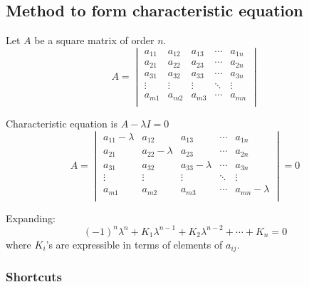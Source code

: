 \documentclass[english,course,fleqn]{lecture}
\begin{document}
\subsection{Method to form characteristic equation}


Let $A$ be a square matrix of order $n$.
\[
  A = \begin{vmatrix}
    a_{11} & a_{12} & a_{13} & \cdots & a_{1n} \\
    a_{21} & a_{22} & a_{23} & \cdots & a_{2n} \\
    a_{31} & a_{32} & a_{33} & \cdots & a_{3n} \\
    \vdots & \vdots & \vdots & \ddots & \vdots \\
    a_{m1} & a_{m2} & a_{m3} & \cdots & a_{mn} \\
  \end{vmatrix}
\]

Characteristic equation is $A - \lambda I = 0$
\[
  A = \begin{vmatrix}
    a_{11} - \lambda & a_{12} & a_{13} & \cdots & a_{1n} \\
    a_{21} & a_{22} - \lambda & a_{23} & \cdots & a_{2n} \\
    a_{31} & a_{32} & a_{33} - \lambda & \cdots & a_{3n} \\
    \vdots & \vdots & \vdots & \ddots & \vdots \\
    a_{m1} & a_{m2} & a_{m3} & \cdots & a_{mn} - \lambda \\
  \end{vmatrix} = 0
\]

Expanding: \[
  (-1)^{n} \lambda^{n} + K_{1}\lambda^{n-1} + K_{2}\lambda^{n-2} + \cdots + K_{n} = 0
\]
where $K_{i}$'s are expressible in terms of elements of $a_{ij}$.

\subsubsection*{Shortcuts}
\end{document}
